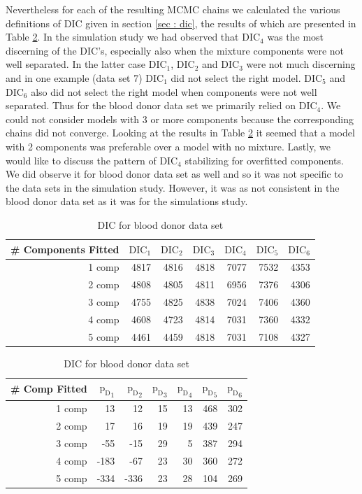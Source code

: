 Nevertheless for each of the resulting MCMC chains we calculated the various definitions of DIC given in section \ref{sec : dic}, the results of which are presented in Table \ref{table : dic_blood_donor}. In the simulation study we had observed that $\text{DIC}_4$ was the most discerning of the DIC's, especially also when the mixture components were not well separated. In the latter case $\text{DIC}_1$, $\text{DIC}_2$ and $\text{DIC}_3$ were not much discerning and in one example (data set 7) $\text{DIC}_1$ did not select the right model. $\text{DIC}_5$ and $\text{DIC}_6$ also did not select the right model when components were not well separated. Thus for the blood donor data set we primarily relied on $\text{DIC}_4$. We could not consider models with 3 or more components because the corresponding chains did not converge. Looking at the results in Table \ref{table : dic_blood_donor} it seemed that a model with 2 components was preferable over a model with no mixture. Lastly, we would like to discuss  the pattern of $\text{DIC}_4$ stabilizing for overfitted components. We did observe it for blood donor data set as well and so it was not specific to the data sets in the simulation study. However, it was as not consistent in the blood donor data set as it was for the simulations study.

\begin{table}[!htb]
\centering
\captionsetup{justification=centering}
\caption{DIC for blood donor data set}
\label{table : dic_blood_donor}
\begin{tabular}{@{}rrrrrrr@{}}
\toprule
\# Components Fitted & $\text{DIC}_1$ & $\text{DIC}_2$ & $\text{DIC}_3$  & $\text{DIC}_4$  & $\text{DIC}_5$  & $\text{DIC}_6$  \\ \midrule
1 comp & 4817 & 4816 & 4818 & 7077 & 7532 & 4353 \\
2 comp & 4808 & 4805 & 4811 & 6956 & 7376 & 4306 \\
3 comp & 4755 & 4825 & 4838 & 7024 & 7406 & 4360 \\
4 comp & 4608 & 4723 & 4814 & 7031 & 7360 & 4332 \\
5 comp & 4461 & 4459 & 4818 & 7031 & 7108 & 4327 \\ \bottomrule
\end{tabular}
\begin{tabular}{@{}rrrrrrr@{}}
\toprule
\# Comp Fitted & ${\text{p}_\text{D}}_1$ & ${\text{p}_\text{D}}_2$ & ${\text{p}_\text{D}}_3$ & ${\text{p}_\text{D}}_4$ & ${\text{p}_\text{D}}_5$ & ${\text{p}_\text{D}}_6$ \\ \midrule
1 comp & 13 & 12 & 15 & 13 & 468 & 302 \\
2 comp & 17 & 16 & 19 & 19 & 439 & 247 \\
3 comp & -55 & -15 & 29 & 5 & 387 & 294 \\
4 comp & -183 & -67 & 23 & 30 & 360 & 272 \\
5 comp & -334 & -336 & 23 & 28 & 104 & 269 \\ \bottomrule
\end{tabular}
\end{table}

